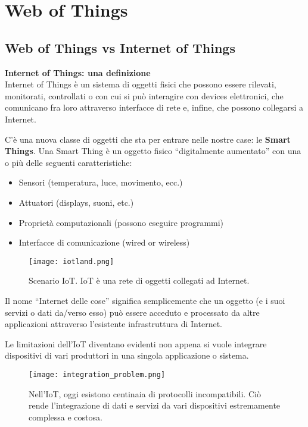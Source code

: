 \chapter{Web of Things}
\label{web-of-things}

\section{Web of Things vs Internet of Things}

\textbf{Internet of Things: una definizione} \\

Internet of Things è un sistema di oggetti fisici che possono essere
rilevati, monitorati, controllati o con cui si può interagire con
devices elettronici, che comunicano fra loro attraverso interfacce di rete
e, infine, che possono collegarsi a Internet.

C'è una nuova classe di oggetti che sta per entrare nelle nostre case:
le \textbf{Smart Things}. Una Smart Thing è un oggetto fisico ``digitalmente
aumentato'' con una o più delle seguenti caratteristiche:

\begin{itemize}
  \item Sensori (temperatura, luce, movimento, ecc.)
  \item Attuatori (displays, suoni, etc.)
  \item Proprietà computazionali (possono eseguire programmi)
  \item Interfacce di comunicazione (wired or wireless)
\end{itemize}

\begin{figure}[H]
  \centering
  \texttt{[image: iotland.png]}
  \caption{Scenario IoT. IoT è una rete di oggetti collegati ad Internet.}
  \label{fig:iotland}
\end{figure}

Il nome ``Internet delle cose'' significa semplicemente che un oggetto (e i
suoi servizi o dati da/verso esso) può essere acceduto e processato da altre
applicazioni attraverso l'esistente infrastruttura di Internet.

Le limitazioni dell'IoT diventano evidenti non appena si vuole integrare
dispositivi di vari produttori in una singola applicazione o sistema.

\begin{figure}[H]
  \centering
  \texttt{[image: integration\_problem.png]}
  \caption{Nell'IoT, oggi esistono centinaia di protocolli incompatibili.
Ciò rende l'integrazione di dati e servizi da vari dispositivi estremamente
complessa e costosa.}
  \label{fig:integration_problem}
\end{figure}

